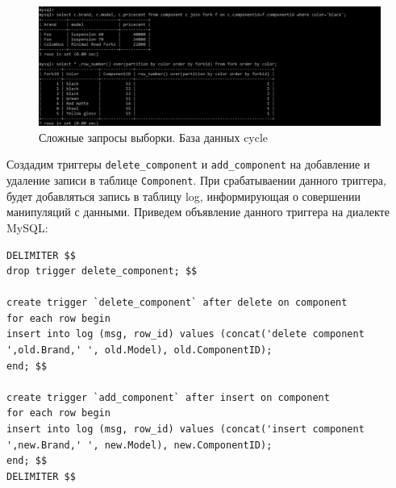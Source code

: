 \documentclass[a4paper,14pt]{extarticle}
\begin{document}
\begin{figure}[h!]
	\centering
	\includegraphics[width=0.7\linewidth]{images/join-window-cycle}
	\caption{Сложные запросы выборки. База данных cycle}
	\label{fig:join-window-cycle}
\end{figure}


Создадим триггеры \texttt{delete\_component} и  \texttt{add\_component} на добавление и удаление записи в таблице \texttt{Component}. При срабатываении данного триггера, будет добавляться запись в таблицу log, информирующая о совершении манипуляций с данными.
\newpage\hfill\newpage
Приведем объявление данного триггера на диалекте MySQL:
\lstset{
	language=sql
}
\begin{lstlisting}
DELIMITER $$
drop trigger delete_component; $$

create trigger `delete_component` after delete on component
for each row begin
insert into log (msg, row_id) values (concat('delete component ',old.Brand,' ', old.Model), old.ComponentID);
end; $$

create trigger `add_component` after insert on component
for each row begin
insert into log (msg, row_id) values (concat('insert component ',new.Brand,' ', new.Model), new.ComponentID);
end; $$
DELIMITER $$
\end{lstlisting}








\end{document}
